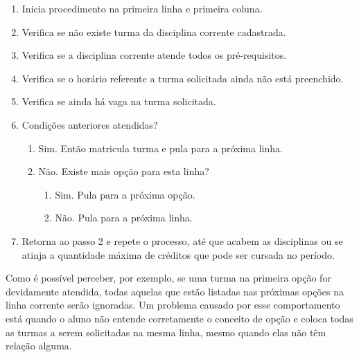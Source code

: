 \documentclass[graduacao,brazil]{ThesisPUC}
\begin{document}
\begin{enumerate}

	\item Inicia procedimento na primeira linha e primeira coluna.

	\item Verifica se não existe turma da disciplina corrente cadastrada.

	\item Verifica se a disciplina corrente atende todos os pré-requisitos.

	\item Verifica se o horário referente a turma solicitada ainda não está preenchido.

	\item Verifica se ainda há vaga na turma solicitada.

	\item Condições anteriores atendidas?

	\begin{enumerate}

		\item  Sim. Então matricula turma e pula para a próxima linha. 

		\item  Não. Existe mais opção para esta linha?

		\begin{enumerate}

			\item Sim. Pula para a próxima opção.

			\item Não. Pula para a próxima linha.

		\end{enumerate}


	\end{enumerate}

	\item Retorna ao passo 2 e repete o processo, até que acabem as disciplinas ou se atinja a quantidade máxima de créditos que pode ser cursada no período.

\end{enumerate}

Como é possível perceber, por exemplo, se uma turma na primeira opção for devidamente atendida, todas aquelas que estão listadas nas próximas opções na linha corrente serão ignoradas. Um problema causado por esse comportamento está quando o aluno não entende corretamente o conceito de opção e coloca todas as turmas a serem solicitadas na mesma linha, mesmo quando elas não têm relação alguma.
\end{document}
